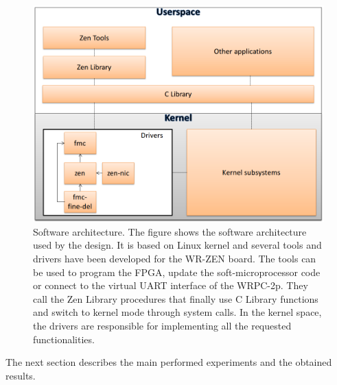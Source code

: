 \begin{figure}[H]
	\centering
	\includegraphics[scale=0.4]{img/software_architecture}
	\caption{Software architecture. The figure shows the software architecture
		used by the design. It is based on Linux kernel and several tools and drivers
		have been developed for the WR-ZEN board. The tools can be used to program 
		the FPGA, update the soft-microprocessor code or connect to the virtual UART
		interface of the WRPC-2p. They call the Zen Library procedures that finally
		use C Library functions and switch to kernel mode through system calls. In the
		kernel space, the drivers are responsible for implementing all the requested 
		functionalities. }
	\label{fig:software_architecture}
\end{figure}

The next section describes the main performed experiments and the obtained results.

